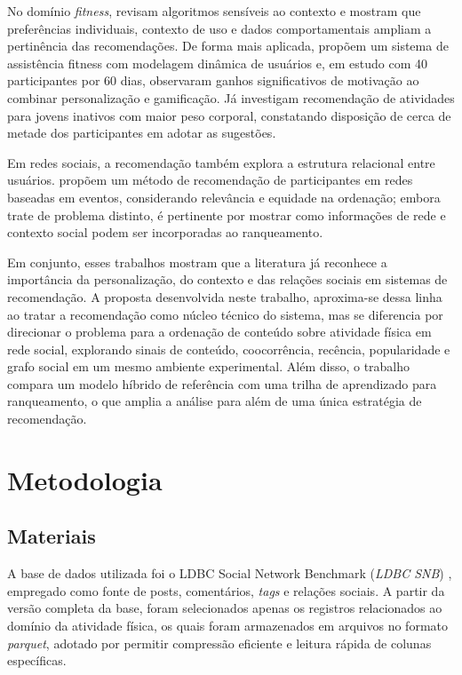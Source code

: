 \documentclass[a4paper,12pt]{article}
\begin{document}
No domínio \textit{fitness},  revisam algoritmos sensíveis ao contexto e mostram que preferências individuais, contexto de uso e dados comportamentais ampliam a pertinência das recomendações. De forma mais aplicada,  propõem um sistema de assistência fitness com modelagem dinâmica de usuários e, em estudo com 40 participantes por 60 dias, observaram ganhos significativos de motivação ao combinar personalização e gamificação. Já  investigam recomendação de atividades para jovens inativos com maior peso corporal, constatando disposição de cerca de metade dos participantes em adotar as sugestões.

Em redes sociais, a recomendação também explora a estrutura relacional entre usuários.  propõem um método de recomendação de participantes em redes baseadas em eventos, considerando relevância e equidade na ordenação; embora trate de problema distinto, é pertinente por mostrar como informações de rede e contexto social podem ser incorporadas ao ranqueamento.

Em conjunto, esses trabalhos mostram que a literatura já reconhece a importância da personalização, do contexto e das relações sociais em sistemas de recomendação. A proposta desenvolvida neste trabalho, aproxima-se dessa linha ao tratar a recomendação como núcleo técnico do sistema, mas se diferencia por direcionar o problema para a ordenação de conteúdo sobre atividade física em rede social, explorando sinais de conteúdo, coocorrência, recência, popularidade e grafo social em um mesmo ambiente experimental. Além disso, o trabalho compara um modelo híbrido de referência com uma trilha de aprendizado para ranqueamento, o que amplia a análise para além de uma única estratégia de recomendação.




\section{Metodologia}

\subsection{Materiais}

A base de dados utilizada foi o LDBC Social Network Benchmark (\textit{LDBC SNB}) \cite{Angles2020LDBCSNB}, empregado como fonte de posts, comentários, \textit{tags} e relações sociais. A partir da versão completa da base, foram selecionados apenas os registros relacionados ao domínio da atividade física, os quais foram armazenados em arquivos no formato \textit{parquet}, adotado por permitir compressão eficiente e leitura rápida de colunas específicas.
\end{document}
